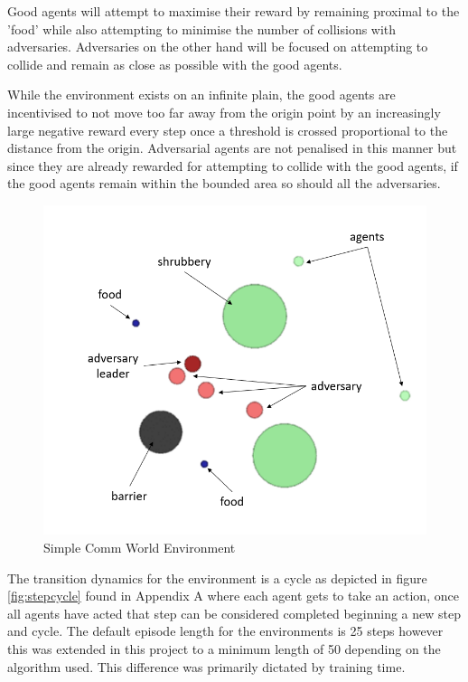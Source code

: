 \documentclass{article}
\begin{document}
Good agents will attempt to maximise their reward by remaining proximal to the 'food' while also attempting to minimise the number of collisions with adversaries.
Adversaries on the other hand will be focused on attempting to collide and remain as close as possible with the good agents.

While the environment exists on an infinite plain, the good agents are incentivised to not move too far away from the origin point by an increasingly large negative reward every step once a threshold is crossed proportional to the distance from the origin.
Adversarial agents are not penalised in this manner but since they are already rewarded for attempting to collide with the good agents, if the good agents remain within the bounded area so should all the adversaries.

\begin{figure}[!ht]
  \centering
  \includegraphics[scale=0.25]{simple_comm_environment.png}
  \caption{Simple Comm World Environment}
  \label{fig:simple_comm_world_2}
\end{figure}

The transition dynamics for the environment is a cycle as depicted in figure \ref{fig:stepcycle} found in Appendix A where each agent gets to take an action, once all agents have acted that step can be considered completed beginning a new step and cycle.
The default episode length for the environments is 25 steps however this was extended in this project to a minimum length of 50 depending on the algorithm used. 
This difference was primarily dictated by training time.
\end{document}
